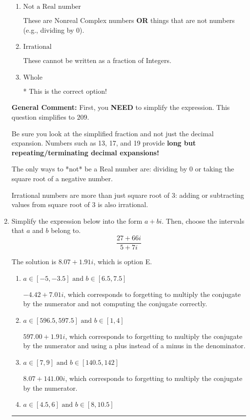 \documentclass{extbook}[14pt]
\newcommand{\litem}[1]{\item #1

\rule{\textwidth}{0.4pt}}
\begin{document}
\begin{enumerate}
{\begin{enumerate}[label=\Alph*.]
These are numbers that can be written as fraction of Integers (e.g., -2/3)
\item \( \text{Not a Real number} \)

These are Nonreal Complex numbers \textbf{OR} things that are not numbers (e.g., dividing by 0).
\item \( \text{Irrational} \)

These cannot be written as a fraction of Integers.
\item \( \text{Whole} \)

* This is the correct option!
\end{enumerate}

\textbf{General Comment:} First, you \textbf{NEED} to simplify the expression. This question simplifies to $209$. 
 
 Be sure you look at the simplified fraction and not just the decimal expansion. Numbers such as 13, 17, and 19 provide \textbf{long but repeating/terminating decimal expansions!} 
 
 The only ways to *not* be a Real number are: dividing by 0 or taking the square root of a negative number. 
 
 Irrational numbers are more than just square root of 3: adding or subtracting values from square root of 3 is also irrational.
}
\litem{
Simplify the expression below into the form $a+bi$. Then, choose the intervals that $a$ and $b$ belong to.
\[ \frac{27 + 66 i}{5 + 7 i} \]

The solution is \( 8.07  + 1.91 i \), which is option E.\begin{enumerate}[label=\Alph*.]
\item \( a \in [-5, -3.5] \text{ and } b \in [6.5, 7.5] \)

 $-4.42  + 7.01 i$, which corresponds to forgetting to multiply the conjugate by the numerator and not computing the conjugate correctly.
\item \( a \in [596.5, 597.5] \text{ and } b \in [1, 4] \)

 $597.00  + 1.91 i$, which corresponds to forgetting to multiply the conjugate by the numerator and using a plus instead of a minus in the denominator.
\item \( a \in [7, 9] \text{ and } b \in [140.5, 142] \)

 $8.07  + 141.00 i$, which corresponds to forgetting to multiply the conjugate by the numerator.
\item \( a \in [4.5, 6] \text{ and } b \in [8, 10.5] \)


\end{enumerate}}
\end{enumerate}
\end{document}
